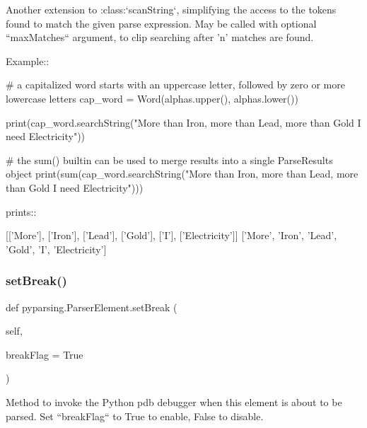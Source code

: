 \begin{DoxyVerb}Another extension to :class:`scanString`, simplifying the access to the tokens found
to match the given parse expression.  May be called with optional
``maxMatches`` argument, to clip searching after 'n' matches are found.

Example::

    # a capitalized word starts with an uppercase letter, followed by zero or more lowercase letters
    cap_word = Word(alphas.upper(), alphas.lower())

    print(cap_word.searchString("More than Iron, more than Lead, more than Gold I need Electricity"))

    # the sum() builtin can be used to merge results into a single ParseResults object
    print(sum(cap_word.searchString("More than Iron, more than Lead, more than Gold I need Electricity")))

prints::

    [['More'], ['Iron'], ['Lead'], ['Gold'], ['I'], ['Electricity']]
    ['More', 'Iron', 'Lead', 'Gold', 'I', 'Electricity']
\end{DoxyVerb}
 \mbox{\label{classpyparsing_1_1ParserElement_a078b62d7a0d94fdb5755c196347022ab}} 
\subsubsection{\texorpdfstring{set\+Break()}{setBreak()}}
{\footnotesize\ttfamily def pyparsing.\+Parser\+Element.\+set\+Break (\begin{DoxyParamCaption}\item[{}]{self,  }\item[{}]{break\+Flag = {\ttfamily True} }\end{DoxyParamCaption})}

\begin{DoxyVerb}Method to invoke the Python pdb debugger when this element is
   about to be parsed. Set ``breakFlag`` to True to enable, False to
   disable.
\end{DoxyVerb}
 \mbox{\label{classpyparsing_1_1ParserElement_ac5d0f98e4a43fd89567d218b36229eae}} 
